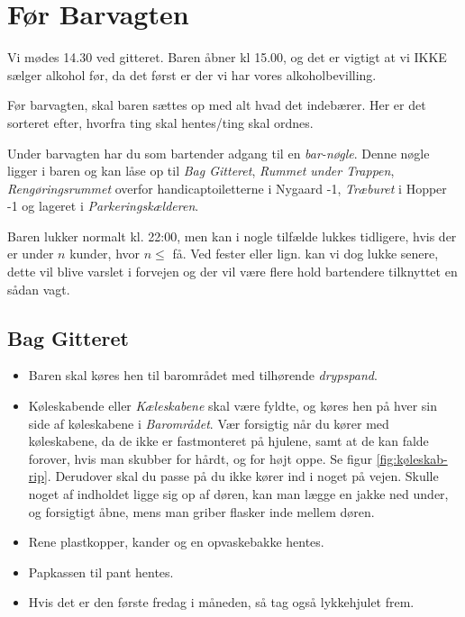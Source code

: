 \section{Før Barvagten}
\label{sec:pre-barvagten}

Vi mødes 14.30 ved gitteret. Baren åbner kl 15.00, og det er vigtigt
at vi IKKE sælger alkohol før, da det først er der vi har vores alkoholbevilling.

Før barvagten, skal baren sættes op med alt hvad det indebærer. Her er
det sorteret efter, hvorfra ting skal hentes/ting skal ordnes.

Under barvagten har du som bartender adgang til en \textit{bar-nøgle}.
Denne nøgle ligger i baren og kan låse op til \textit{Bag Gitteret},
\textit{Rummet under Trappen}, 
\textit{Rengøringsrummet} overfor handicaptoiletterne i Nygaard -1,
\textit{Træburet} i Hopper -1
og lageret i \textit{Parkeringskælderen}.

Baren lukker normalt kl. 22:00, men kan i nogle tilfælde lukkes tidligere, hvis der er under
$n$ kunder, hvor $n \le$ få.
Ved fester eller lign. kan vi dog lukke senere, dette vil blive varslet i forvejen og der vil
være flere hold bartendere tilknyttet en sådan vagt.

\subsection{Bag Gitteret}
\label{sec:pre:bag-ved-gitteret}

\begin{itemize}
	\item Baren skal køres hen til barområdet med tilhørende \textit{drypspand}.
	\item Køleskabende eller \textit{Kæleskabene} skal være fyldte, og køres hen på hver sin side af køleskabene i
	\textit{Barområdet}. Vær forsigtig når du kører med køleskabene, da de ikke er fastmonteret på hjulene,
	samt at de kan falde forover, hvis man skubber for hårdt, og for højt oppe. Se figur \ref{fig:køleskab-rip}. Derudover skal
	du passe på du ikke kører ind i noget på vejen. Skulle noget af indholdet ligge sig op af døren, kan man lægge en jakke
	ned under, og forsigtigt åbne, mens man griber flasker inde mellem døren.
	\item Rene plastkopper, kander og en opvaskebakke hentes.
	\item Papkassen til pant hentes.
	\item Hvis det er den første fredag i måneden, så tag også lykkehjulet frem.
\end{itemize}

